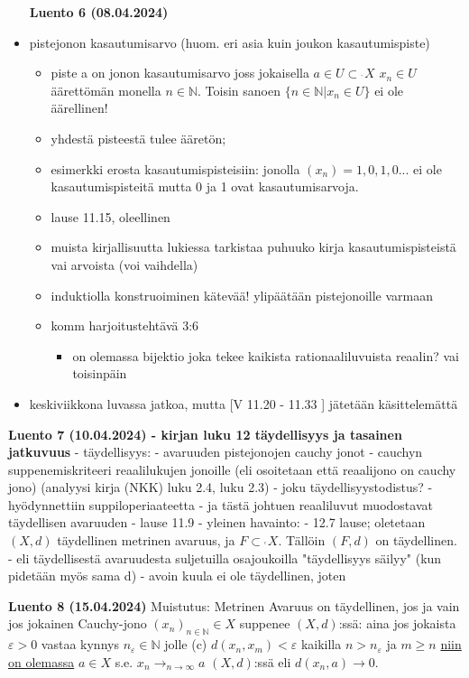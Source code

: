 \documentclass[12pt,a4paper,leqno]{amsart}
\newcommand{\css}{\operatorname{\subset\!\!\!\!_{^{^c}}}}
\newcommand{\oss}{\operatorname{\subset\!\!\!\!_{^{^\circ}}}}
\begin{document}
\begin{itemize}
\textbf{Luento 6 (08.04.2024)}
\item pistejonon kasautumisarvo (huom. eri asia kuin joukon kasautumispiste)
\begin{itemize}
    \item piste a on jonon kasautumisarvo joss jokaisella $a \in U \oss X$ $x_n \in U$ äärettömän monella $n \in \mathbb{N}$. Toisin sanoen $\{ n \in \mathbb{N} \vert x_n \in U\}$ ei ole äärellinen!
    \item yhdestä pisteestä tulee ääretön; 
    \item esimerkki erosta kasautumispisteisiin: jonolla $(x_n) = 1, 0, 1, 0...$ ei ole kasautumispisteitä mutta 0 ja 1 ovat kasautumisarvoja.
    \item lause 11.15, oleellinen
    \item muista kirjallisuutta lukiessa tarkistaa puhuuko kirja kasautumispisteistä vai arvoista (voi vaihdella)
    \item induktiolla konstruoiminen kätevää! ylipäätään pistejonoille varmaan
\end{itemize}
\begin{itemize}
    \item komm harjoitustehtävä 3:6
    \begin{itemize}
        \item on olemassa bijektio joka tekee kaikista rationaaliluvuista reaalin? vai toisinpäin
    \end{itemize}
\end{itemize}
\item keskiviikkona luvassa jatkoa, mutta [V 11.20 - 11.33 ] jätetään käsittelemättä

\end{itemize}
\textbf{Luento 7 (10.04.2024) - kirjan luku 12 täydellisyys ja tasainen jatkuvuus}
- täydellisyys:
    - avaruuden pistejonojen cauchy jonot
    - cauchyn suppenemiskriteeri reaalilukujen jonoille (eli osoitetaan että reaalijono on cauchy jono) (analyysi kirja (NKK) luku 2.4, luku 2.3)
        - joku täydellisyystodistus?
        - hyödynnettiin suppiloperiaateetta
        - ja tästä johtuen reaaliluvut muodostavat täydellisen avaruuden
    - lause 11.9
- yleinen havainto: 
  - 12.7 lause; oletetaan $(X, d)$ täydellinen metrinen avaruus, ja $F \css X$. Tällöin $(F, d)$ on täydellinen.
    - eli täydellisestä avaruudesta suljetuilla osajoukoilla "täydellisyys säilyy" (kun pidetään myös sama d)
    - avoin kuula ei ole täydellinen, joten 

\textbf{Luento 8 (15.04.2024)}
Muistutus: Metrinen Avaruus on täydellinen, jos ja vain jos jokainen Cauchy-jono $(x_n)_{n\in \mathbb{N}} \in X$ suppenee $(X, d)$:ssä: aina jos jokaista $\varepsilon > 0$ vastaa kynnys $n_\varepsilon \in \mathbb{N}$ jolle (c) $d(x_n, x_m) < \varepsilon$ kaikilla $n > n_\varepsilon$ ja $m \geq n$ \underline{niin on olemassa} $a \in X$ s.e. $x_n \rightarrow_{n\rightarrow \infty} a$ $(X, d)$:ssä eli $d(x_n, a) \rightarrow 0$. 
\end{document}
